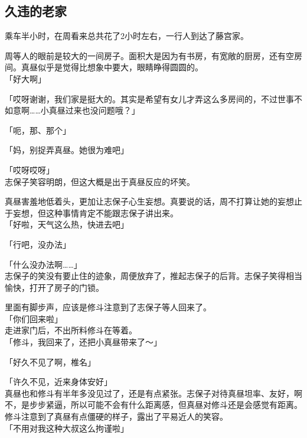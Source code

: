 \subsection{久违的老家}

乘车半小时，在周看来总共花了2小时左右，一行人到达了藤宫家。

周等人的眼前是较大的一间房子。面积大是因为有书房，有宽敞的厨房，还有空房间。真昼似乎是觉得比想象中要大，眼睛睁得圆圆的。\\

「好大啊」

「哎呀谢谢，我们家是挺大的。其实是希望有女儿才弄这么多房间的，不过世事不如意啊……小真昼过来也没问题哦？」

「呃，那、那个」

「妈，别捉弄真昼。她很为难吧」

「哎呀哎呀」\\

志保子笑容明朗，但这大概是出于真昼反应的坏笑。

真昼害羞地低着头，更加让志保子心生妄想。真要说的话，周不打算让她的妄想止于妄想，但这种事情肯定不能跟志保子讲出来。\\

「好啦，天气这么热，快进去吧」

「行吧，没办法」

「什么没办法啊……」\\

志保子的笑没有要止住的迹象，周便放弃了，推起志保子的后背。志保子笑得相当愉快，打开了房子的门锁。

里面有脚步声，应该是修斗注意到了志保子等人回来了。\\

「你们回来啦」\\

走进家门后，不出所料修斗在等着。\\

「修斗，我回来了，还把小真昼带来了～」

「好久不见了啊，椎名」

「许久不见，近来身体安好」\\

真昼也和修斗有半年多没见过了，还是有点紧张。志保子对待真昼坦率、友好，啊不，是步步紧逼，所以可能不会有什么距离感，但真昼对修斗还是会感觉有距离。\\

修斗注意到了真昼有点僵硬的样子，露出了平易近人的笑容。\\

「不用对我这种大叔这么拘谨啦」

